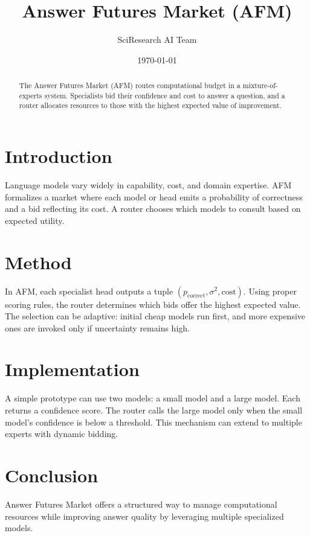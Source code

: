 \documentclass{article}
\title{Answer Futures Market (AFM)}
\author{SciResearch AI Team}
\date{\today}
\begin{document}
\maketitle
\begin{abstract}
The Answer Futures Market (AFM) routes computational budget in a
mixture-of-experts system. Specialists bid their confidence and cost to
answer a question, and a router allocates resources to those with the
highest expected value of improvement.
\end{abstract}
\section{Introduction}
Language models vary widely in capability, cost, and domain expertise.
AFM formalizes a market where each model or head emits a probability of
correctness and a bid reflecting its cost. A router chooses which
models to consult based on expected utility.
\section{Method}
In AFM, each specialist head outputs a tuple $(p_{\text{correct}},
\sigma^2, \text{cost})$. Using proper scoring rules, the router
determines which bids offer the highest expected value. The selection
can be adaptive: initial cheap models run first, and more expensive ones
are invoked only if uncertainty remains high.
\section{Implementation}
A simple prototype can use two models: a small model and a large model.
Each returns a confidence score. The router calls the large model only
when the small model's confidence is below a threshold. This mechanism
can extend to multiple experts with dynamic bidding.
\section{Conclusion}
Answer Futures Market offers a structured way to manage computational
resources while improving answer quality by leveraging multiple
specialized models.
\end{document}
